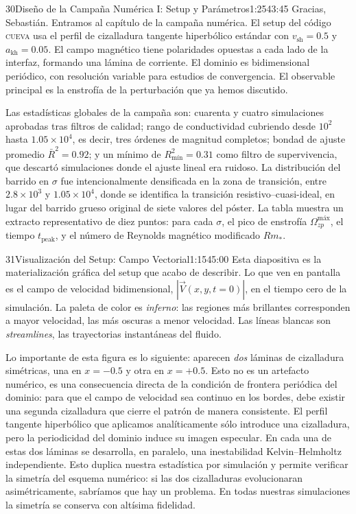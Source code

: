 \documentclass[11pt,a4paper]{article}
\begin{document}
\begin{bryorador}{30}{Diseño de la Campaña Numérica I: Setup y Parámetros}{1:25}{43:45}
Gracias, Sebastián. Entramos al capítulo de la campaña numérica. El setup del
código \textsc{cueva} usa el perfil de cizalladura tangente hiperbólico
estándar con $v_\text{sh}=0.5$ y $a_\text{kh}=0.05$. El campo magnético tiene
polaridades opuestas a cada lado de la interfaz, formando una lámina de
corriente. El dominio es bidimensional periódico, con resolución variable
para estudios de convergencia. El observable principal es la enstrofía de la
perturbación que ya hemos discutido.

Las estadísticas globales de la campaña son: cuarenta y cuatro simulaciones
aprobadas tras filtros de calidad; rango de conductividad cubriendo desde
$10^2$ hasta $1.05\times 10^4$, es decir, tres órdenes de magnitud completos;
bondad de ajuste promedio $\bar R^2=0.92$; y un mínimo de $R^2_\text{mín}=0.31$
como filtro de supervivencia, que descartó simulaciones donde el ajuste lineal
era ruidoso. La distribución del barrido en $\sigma$ fue intencionalmente
densificada en la zona de transición, entre $2.8\times 10^3$ y
$1.05\times 10^4$, donde se identifica la transición resistivo--cuasi-ideal,
en lugar del barrido grueso original de siete valores del póster. La tabla
muestra un extracto representativo de diez puntos: para cada $\sigma$, el
pico de enstrofía $\Omega^\text{máx}_{zp}$, el tiempo $t_\text{peak}$, y el
número de Reynolds magnético modificado $Rm_*$.
\end{bryorador}

\begin{bryorador}{31}{Visualización del Setup: Campo Vectorial}{1:15}{45:00}
Esta diapositiva es la materialización gráfica del setup que acabo de
describir. Lo que ven en pantalla es el campo de velocidad bidimensional,
$|\vec V(x,y,t=0)|$, en el tiempo cero de la simulación. La paleta de color
es \emph{inferno}: las regiones más brillantes corresponden a mayor velocidad,
las más oscuras a menor velocidad. Las líneas blancas son \emph{streamlines},
las trayectorias instantáneas del fluido.

Lo importante de esta figura es lo siguiente: aparecen \emph{dos} láminas de
cizalladura simétricas, una en $x=-0.5$ y otra en $x=+0.5$. Esto no es un
artefacto numérico, es una consecuencia directa de la condición de frontera
periódica del dominio: para que el campo de velocidad sea continuo en los
bordes, debe existir una segunda cizalladura que cierre el patrón de manera
consistente. El perfil tangente hiperbólico que aplicamos analíticamente sólo
introduce una cizalladura, pero la periodicidad del dominio induce su imagen
especular. En cada una de estas dos láminas se desarrolla, en paralelo, una
inestabilidad Kelvin--Helmholtz independiente. Esto duplica nuestra
estadística por simulación y permite verificar la simetría del esquema
numérico: si las dos cizalladuras evolucionaran asimétricamente, sabríamos
que hay un problema. En todas nuestras simulaciones la simetría se conserva
con altísima fidelidad.
\end{bryorador}
\end{document}
